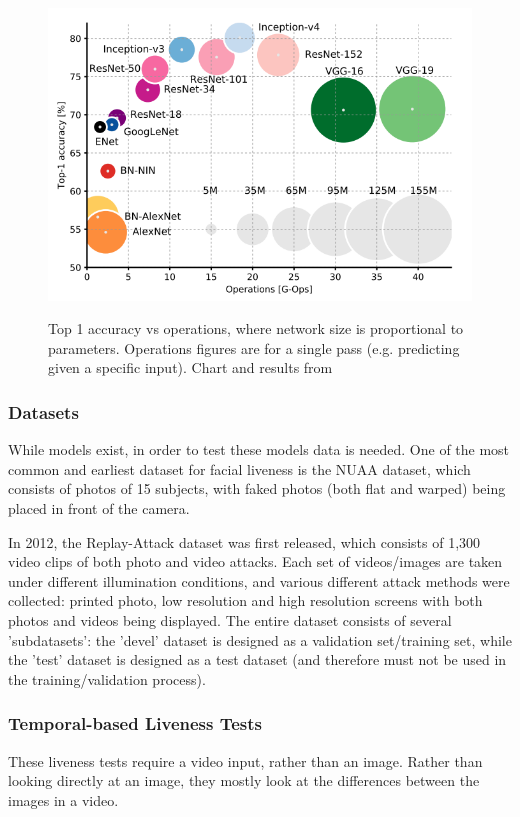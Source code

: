 \documentclass[10pt,a4paper]{article}
\begin{document}
        \begin{figure}
            \centering
            \includegraphics[width=.7\linewidth]{Top1AccuracyOverOperations.png}
            \label{Top1AccuracyOverOperations}
            \caption{Top 1 accuracy vs operations, where network size is proportional to parameters. Operations figures are for a single pass (e.g. predicting given a specific input). Chart and results from \cite{DeepNeuralNetworkDeployability}}
        \end{figure}

        \subsubsection{Datasets}
        While models exist, in order to test these models data is needed. One of the most common and earliest dataset for facial liveness is the NUAA dataset,
        which consists of photos of 15 subjects, with faked photos (both flat and warped) being placed in front of the camera. \cite{NUAADataset}

        In 2012, the Replay-Attack dataset was first released, which consists of 1,300 video clips of both photo and video attacks. Each
        set of videos/images are taken under different illumination conditions, and various different attack methods were collected: printed photo, low resolution and high resolution screens with both photos and 
        videos being displayed. The entire dataset consists of several 'subdatasets': the 'devel' dataset is designed as a validation set/training set, while
        the 'test' dataset is designed as a test dataset (and therefore must not be used in the training/validation process). \cite{ReplayAttackDataset}


        \subsubsection{Temporal-based Liveness Tests}
        These liveness tests require a video input, rather than an image. Rather than looking directly at an image, they mostly look at the differences between the images in a video.
        
\end{document}
